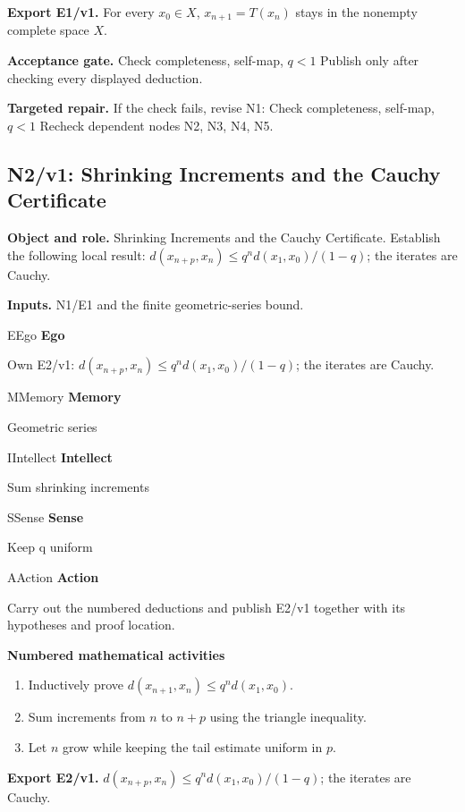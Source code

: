 \documentclass[preprint,12pt,aps,pra,showkeys,amsmath,amssymb,superscriptaddress,floatfix]{revtex4-2}
\theoremstyle{definition}
\theoremstyle{remark}
\newcommand{\mmfaculty}[3]{%
 \begin{mmfacultybox}{#1}{#2}
 {\sffamily\bfseries\color{MMBlue}#2}\par\smallskip #3
 \end{mmfacultybox}}
\newcommand{\field}[2]{\par\smallskip\noindent\textbf{#1.} #2\par}
\begin{document}
\field{Export E1/v1}{For every \(x_0\in X\), \(x_{n+1}=T(x_n)\) stays in the nonempty
complete space \(X\).}

\field{Acceptance gate}{Check completeness, self-map, \(q<1\) Publish only after checking every
displayed deduction.}

\field{Targeted repair}{If the check fails, revise N1: Check completeness, self-map, \(q<1\)
Recheck dependent nodes N2, N3, N4, N5.}

\clearpage

\subsection{N2/v1: Shrinking Increments and the Cauchy Certificate}

\field{Object and role}{Shrinking Increments and the Cauchy Certificate. Establish the following
local result: \(d(x_{n+p},x_n)\le q^n d(x_1,x_0)/(1-q)\); the iterates
are Cauchy.}

\field{Inputs}{N1/E1 and the finite geometric-series bound.}

\mmfaculty{E}{Ego}{Own E2/v1: \(d(x_{n+p},x_n)\le q^n d(x_1,x_0)/(1-q)\); the iterates are
Cauchy.}

\mmfaculty{M}{Memory}{Geometric series}

\mmfaculty{I}{Intellect}{Sum shrinking increments}

\mmfaculty{S}{Sense}{Keep q uniform}

\mmfaculty{A}{Action}{Carry out the numbered deductions and publish E2/v1 together with its
hypotheses and proof location.}

\smallskip\noindent\textbf{Numbered mathematical activities}

\begin{enumerate}[label=N2.\arabic*,leftmargin=3.4em]

\item Inductively prove \(d(x_{n+1},x_n)\le q^n d(x_1,x_0)\).

\item Sum increments from \(n\) to \(n+p\) using the triangle inequality.

\item Let \(n\) grow while keeping the tail estimate uniform in \(p\).

\end{enumerate}

\field{Export E2/v1}{\(d(x_{n+p},x_n)\le q^n d(x_1,x_0)/(1-q)\); the iterates are Cauchy.}
\end{document}
